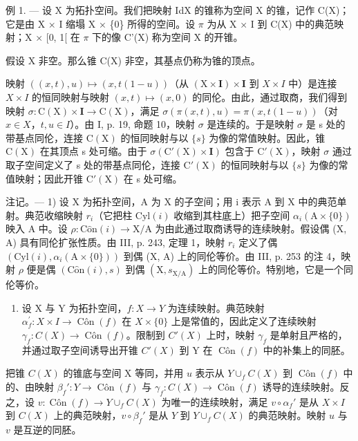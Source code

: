 例 1. --- 设 X 为拓扑空间。我们把映射 IdX 的锥称为空间 X 的锥，记作 C(X)；它是由 X × I 缩塌 X × \{0\} 所得的空间。设 \(\pi\) 为从 X × I 到 C(X) 中的典范映射；X × {[}0, 1{[} 在 \(\pi\) 下的像 C'(X) 称为空间 X 的开锥。

假设 X 非空。那么锥 C(X) 非空，其基点仍称为锥的顶点。

映射 \(((x,t),u)\mapsto(x,t(1-u))\)（从 \((\mathrm{X}\times\mathbf{I})\times\mathbf{I}\) 到 \(X\times I\) 中）是连接 \(X\times I\) 的恒同映射与映射 \((x,t)\mapsto(x,0)\) 的同伦。由此，通过取商，我们得到映射 \(\sigma\colon\mathrm{C}(\mathrm{X})\times\mathbf{I}\to\mathrm{C}(\mathrm{X})\)，满足 \(\sigma(\pi(x,t),u)=\pi(x,t(1-u))\)（对 \(x\in X\)，\(t,u\in I\)）。由 I, p. 19, 命题 10，映射 \(\sigma\) 是连续的。于是映射 \(\sigma\) 是 s 处的带基点同伦，连接 \(\mathrm{C}(\mathrm{X})\) 的恒同映射与以 \(\{s\}\) 为像的常值映射。因此，锥 \(\mathrm{C}(\mathrm{X})\) 在其顶点 s 处可缩。由于 \(\sigma(\mathrm{C}'(\mathrm{X})\times\mathbf{I})\) 包含于 \(\mathrm{C}'(\mathrm{X})\)，映射 \(\sigma\) 通过取子空间定义了 s 处的带基点同伦，连接 \(\mathrm{C}'(\mathrm{X})\) 的恒同映射与以 \(\{s\}\) 为像的常值映射；因此开锥 \(\mathrm{C}'(\mathrm{X})\) 在 s 处可缩。

注记。--- 1) 设 X 为拓扑空间，A 为 X 的子空间；用 i 表示 A 到 X 中的典范单射。典范收缩映射 \(r_{i}\)（它把柱 \(\mathrm{Cyl}(i)\) 收缩到其柱底上）把子空间 \(\alpha_{i}(\mathrm{A} \times \{0\})\) 映入 A 中。设 \(\rho: \mathrm{C}\hat{\mathrm{o}}\mathrm{n}(i) \to \mathrm{X}/\mathrm{A}\) 为由此通过取商诱导的连续映射。假设偶 (X, A) 具有同伦扩张性质。由 III, p. 243, 定理 1，映射 \(r_{i}\) 定义了偶 \((\mathrm{Cyl}(i), \alpha_{i}(\mathrm{A} \times \{0\}))\) 到偶 (X, A) 上的同伦等价。由 III, p. 253 的注 4，映射 \(\rho\) 便是偶 \((\mathrm{C}\hat{\mathrm{o}}\mathrm{n}(i), s)\) 到偶 \((\mathrm{X}, s_{\mathrm{X}/\mathrm{A}})\) 上的同伦等价。特别地，它是一个同伦等价。

\begin{enumerate}
\def\labelenumi{\arabic{enumi})}
\setcounter{enumi}{1}
\tightlist
\item
  设 X 与 Y 为拓扑空间，\(f\colon X \to Y\) 为连续映射。典范映射 \(\alpha_{f}^{\prime}\colon X \times I \to \operatorname{Côn}(f)\) 在 \(X \times \{0\}\) 上是常值的，因此定义了连续映射 \(\gamma_{f}\colon C(X) \to \operatorname{Côn}(f)\)。限制到 \(C'(X)\) 上时，映射 \(\gamma_{f}\) 是单射且严格的，并通过取子空间诱导出开锥 \(C'(X)\) 到 Y 在 \(\operatorname{Côn}(f)\) 中的补集上的同胚。
\end{enumerate}

把锥 \(C(X)\) 的锥底与空间 X 等同，并用 \(u\) 表示从 \(Y \cup_f C(X)\) 到 \(\operatorname{Côn}(f)\) 中的、由映射 \(\beta_f':Y\to\operatorname{Côn}(f)\) 与 \(\gamma_f:C(X)\to\operatorname{Côn}(f)\) 诱导的连续映射。反之，设 \(v:\operatorname{Côn}(f)\to Y\cup_f C(X)\) 为唯一的连续映射，满足 \(v\circ\alpha_f'\) 是从 \(X\times I\) 到 \(C(X)\) 上的典范映射，\(v\circ\beta_f'\) 是从 \(Y\) 到 \(Y\cup_f C(X)\) 的典范映射。映射 \(u\) 与 \(v\) 是互逆的同胚。

